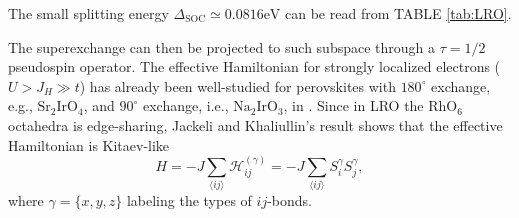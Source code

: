 \documentclass[10pt,nofootinbib,letterpaper]{revtex4}
\begin{document}
		The small splitting energy $\Delta_{\text{SOC}}\simeq0.0816\mathrm{eV}$ can be read from TABLE \ref{tab:LRO}.\par
		The superexchange can then be projected to such subspace through a $\tau=1/2$ pseudospin operator. The effective Hamiltonian for strongly localized electrons ($U>J_H\gg t$) has already been well-studied for perovskites with $180^\circ$ exchange, e.g., $\mathrm{Sr}_2\mathrm{IrO}_4$, and $90^\circ$ exchange, i.e., $\mathrm{Na}_2\mathrm{IrO}_3$, in \cite{jackeli2009mott}. Since in LRO the $\mathrm{RhO}_6$ octahedra is edge-sharing, Jackeli and Khaliullin's result shows that the effective Hamiltonian is Kitaev-like \cite{kitaev2006anyons}
		\begin{equation}\label{1.2.2}
			H=-J\sum_{\langle ij \rangle }\mathcal{H}^{(\gamma)}_{ij}=-J\sum_{\langle ij \rangle}S_i^\gamma S_j^\gamma,
		\end{equation}
		where $\gamma=\{x,y,z\}$ labeling the types of $ij$-bonds.
\end{document}
